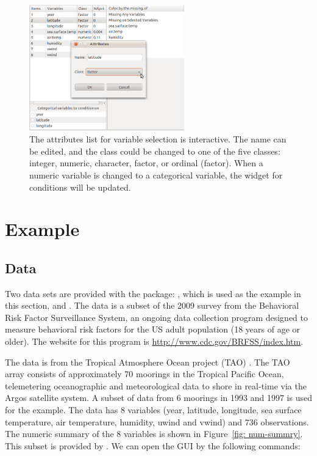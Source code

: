 \documentclass[article]{jss}
\begin{document}
\begin{center}
\begin{figure}[h]
\begin{centering}
\includegraphics[width=0.6\textwidth]{graph/fig8-query}
\par\end{centering}
\caption{The attributes list for variable selection is interactive.
The name can be edited, and the class could be changed to one of
the five classes: integer, numeric, character, factor, or ordinal
(factor). When a numeric variable is changed to a categorical
variable, the widget for conditions will be updated.}
\label{fig: attributes}
\end{figure}
\par\end{center}

\section{Example}\label{Examples}

\subsection{Data}

Two data sets are provided with the package: , which
is used as the example in this section, and . The
 data is a subset of the 2009 survey from the
Behavioral Risk Factor Surveillance System, an ongoing data
collection program designed to measure behavioral risk factors
for the US adult population (18 years of age or older). The
website for this program is \url{http://www.cdc.gov/BRFSS/index.htm}.

The data  is from the Tropical Atmosphere Ocean
project (TAO) \citep{tao}. The TAO array consists of approximately
70 moorings in the Tropical Pacific Ocean, telemetering oceanographic
and meteorological data to shore in real-time via the Argos
satellite system. A subset of data from 6 moorings in 1993
and 1997 is used for the example. The data has 8 variables
(year, latitude, longitude, sea surface temperature, air temperature,
humidity, uwind and vwind) and 736 observations. The numeric
summary of the 8 variables is shown in Figure~\ref{fig: num-summry}.
This subset is provided by \citet{CS07}. We can open the GUI
by the following commands:
\end{document}

